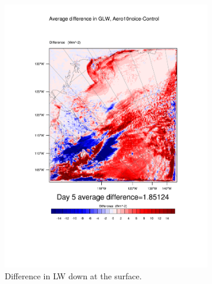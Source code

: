 \begin{figure}
	\begin{subfigure}{0.48\textwidth}
		\centering
		\includegraphics[width=\textwidth]{results/aero10ni/diff_Aero10NoIce_GLW_Day5.pdf}
		\caption{Difference in LW down at the surface.}
		\label{subfig:glw_r4Day5}
	\end{subfigure}
	\quad
	\begin{subfigure}{0.48\textwidth}
		\centering

\end{subfigure}
\end{figure}
